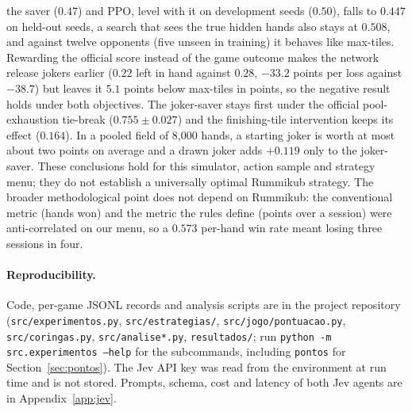 \documentclass[11pt]{article}
\begin{document}
the saver ($0.47$) and PPO, level with it on development seeds ($0.50$), falls to $0.447$ on held-out seeds, a search that sees the true hidden hands also stays at $0.508$, and against twelve opponents (five unseen in training) it behaves like max-tiles. Rewarding the official score instead of the game outcome makes the network release jokers earlier ($0.22$ left in hand against $0.28$, $-33.2$ points per loss against $-38.7$) but leaves it $5.1$ points below max-tiles in points, so the negative result holds under both objectives. The joker-saver stays first under the official pool-exhaustion tie-break ($0.755\pm0.027$) and the finishing-tile intervention keeps its effect ($0.164$). In a pooled field of 8{,}000 hands, a starting joker is worth at most about two points on average and a drawn joker adds $+0.119$ only to the joker-saver. These conclusions hold for this simulator, action sample and strategy menu; they do not establish a universally optimal Rummikub strategy. The broader methodological point does not depend on Rummikub: the conventional metric (hands won) and the metric the rules define (points over a session) were anti-correlated on our menu, so a $0.573$ per-hand win rate meant losing three sessions in four.

\paragraph{Reproducibility.} Code, per-game JSONL records and analysis scripts are in the project repository (\texttt{src/experimentos.py}, \texttt{src/estrategias/}, \texttt{src/jogo/pontuacao.py}, \texttt{src/coringas.py}, \texttt{src/analise*.py}, \texttt{resultados/}; run \texttt{python -m src.experimentos --help} for the subcommands, including \texttt{pontos} for Section~\ref{sec:pontos}). The Jev API key was read from the environment at run time and is not stored. Prompts, schema, cost and latency of both Jev agents are in Appendix~\ref{app:jev}.
\end{document}
